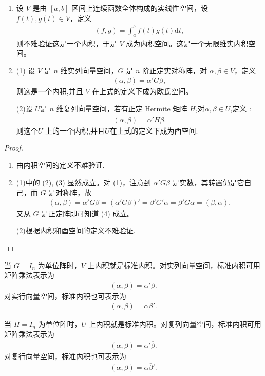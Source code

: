 \documentclass[../../main.tex]{subfiles}
\begin{document}
\begin{example}\label{example:一些常见的内积及内积空间}
\begin{enumerate}
\item 设 \(V\) 是由 \([a,b]\) 区间上连续函数全体构成的实线性空间，设 \(f(t),g(t)\in V\)，定义
\begin{align*}
(f,g)=\int_{a}^{b}f(t)g(t)\mathrm{d}t,
\end{align*}
则不难验证这是一个内积，于是 \(V\) 成为内积空间。这是一个无限维实内积空间。

\item (1) 设 \(V\) 是 \(n\) 维实列向量空间，\(G\) 是 \(n\) 阶正定实对称阵，对 \(\alpha,\beta\in V\)，定义
\begin{align*}
(\alpha,\beta)=\alpha'G\beta,
\end{align*}
则这是一个内积,并且 \(V\) 在上式的定义下成为欧氏空间。

(2)设 \(U\)是 \(n\) 维复列向量空间，若有正定 Hermite 矩阵 \(H\),对$\alpha ,\beta \in U$,定义 :
\begin{align*}
(\alpha,\beta)=\alpha'H\overline{\beta}.
\end{align*}
则这个\(U\) 上的一个内积,并且$U$在上式的定义下成为酉空间.
\end{enumerate}
\end{example}
\begin{proof}
\begin{enumerate}
\item 由内积空间的定义不难验证.

\item (1)中的 (2), (3) 显然成立。对 (1)，注意到 \(\alpha'G\beta\) 是实数，其转置仍是它自己，而 \(G\) 是对称阵，故
\begin{align*}
(\alpha,\beta)=\alpha'G\beta=(\alpha'G\beta)'=\beta'G'\alpha=\beta'G\alpha=(\beta,\alpha).
\end{align*}
又从 \(G\) 是正定阵即可知道 (4) 成立。 

(2)根据内积和酉空间的定义不难验证.
\end{enumerate}

\end{proof}
\begin{remark}
当 \(G = I_n\) 为单位阵时，\(V\) 上内积就是标准内积。对实列向量空间，标准内积可用矩阵乘法表示为
\begin{align*}
(\alpha,\beta)=\alpha'\beta.
\end{align*}
对实行向量空间，标准内积也可表示为
\begin{align*}
(\alpha,\beta)=\alpha\beta'.
\end{align*}

当 \(H = I_n\) 为单位阵时，\(U\) 上内积就是标准内积。对复列向量空间，标准内积可用矩阵乘法表示为
\begin{align*}
(\alpha,\beta)=\alpha'\overline{\beta}.
\end{align*}
对复行向量空间，标准内积也可表示为
\begin{align*}
(\alpha,\beta)=\alpha\overline{\beta}'.
\end{align*} 
\end{remark}
\end{document}
